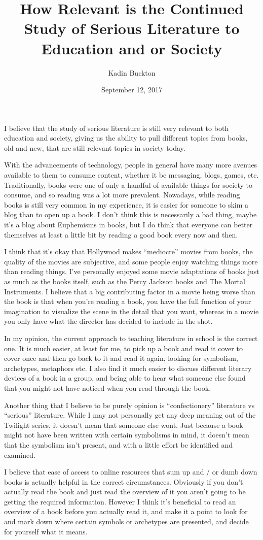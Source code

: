 \documentclass[11pt]{article}
\author{Kadin Buckton}
\date{September 12, 2017}
\title{How Relevant is the Continued Study of Serious Literature to Education and or Society}
\begin{document}
\maketitle
I believe that the study of serious literature is still very relevant to both education and society, giving us the ability to pull different topics from books, old and new, that are still relevant topics in society today. 

With the advancements of technology, people in general have many more avenues available to them to consume content, whether it be messaging, blogs, games, etc. Traditionally, books were one of only a handful of available things for society to consume, and so reading was a lot more prevalent. Nowadays, while reading books is still very common in my experience, it is easier for someone to skim a blog than to open up a book. I don't think this is necessarily a bad thing, maybe it's a blog about Euphemisms in books, but I do think that everyone can better themselves at least a little bit by reading a good book every now and then.

I think that it's okay that Hollywood makes ``mediocre'' movies from books, the quality of the movies are subjective, and some people enjoy watching things more than reading things. I've personally enjoyed some movie adaptations of books just as much as the books itself, such as the Percy Jackson books and The Mortal Instruments. I believe that a big contributing factor in a movie being worse than the book is that when you're reading a book, you have the full function of your imagination to visualize the scene in the detail that you want, whereas in a movie you only have what the director has decided to include in the shot.

In my opinion, the current approach to teaching literature in school is the correct one. It is much easier, at least for me, to pick up a book and read it cover to cover once and then go back to it and read it again, looking for symbolism, archetypes, metaphors etc. I also find it much easier to discuss different literary devices of a book in a group, and being able to hear what someone else found that you might not have noticed when you read through the book.

Another thing that I believe to be purely opinion is ``confectionery'' literature vs ``serious'' literature. While I may not personally get any deep meaning out of the Twilight series, it doesn't mean that someone else wont. Just because a book might not have been written with certain symbolisms in mind, it doesn't mean that the symbolism isn't present, and with a little effort be identified and examined.

I believe that ease of access to online resources that sum up and / or dumb down books is actually helpful in the correct circumstances. Obviously if you don't actually read the book and just read the overview of it you aren't going to be getting the required information. However I think it's beneficial to read an overview of a book before you actually read it, and make it a point to look for and mark down where certain symbols or archetypes are presented, and decide for yourself what it means.
\end{document}
